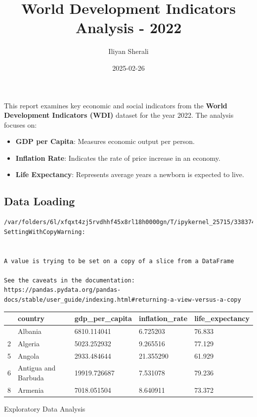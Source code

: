 \documentclass[
  letterpaper,
  DIV=11,
  numbers=noendperiod]{scrartcl}
\title{World Development Indicators Analysis - 2022}
\author{Iliyan Sherali}
\date{2025-02-26}
\providecommand{\tightlist}{%
  \setlength{\itemsep}{0pt}\setlength{\parskip}{0pt}}\usepackage{longtable,booktabs,array}
\begin{document}
\maketitle


This report examines key economic and social indicators from the
\textbf{World Development Indicators (WDI)} dataset for the year 2022.
The analysis focuses on:

\begin{itemize}
\tightlist
\item
  \textbf{GDP per Capita}: Measures economic output per person.
\item
  \textbf{Inflation Rate}: Indicates the rate of price increase in an
  economy.
\item
  \textbf{Life Expectancy}: Represents average years a newborn is
  expected to live.
\end{itemize}

\subsection{Data Loading}\label{data-loading}

\begin{verbatim}
/var/folders/6l/xfqxt4zj5rvdhhf45x8rl18h0000gn/T/ipykernel_25715/3383743568.py:10: SettingWithCopyWarning:


A value is trying to be set on a copy of a slice from a DataFrame

See the caveats in the documentation: https://pandas.pydata.org/pandas-docs/stable/user_guide/indexing.html#returning-a-view-versus-a-copy
\end{verbatim}

\begin{longtable}[]{@{}lllll@{}}
\toprule\noalign{}
& country & gdp\_per\_capita & inflation\_rate & life\_expectancy \\
\midrule\noalign{}
\endhead
\bottomrule\noalign{}
\endlastfoot
1 & Albania & 6810.114041 & 6.725203 & 76.833 \\
2 & Algeria & 5023.252932 & 9.265516 & 77.129 \\
5 & Angola & 2933.484644 & 21.355290 & 61.929 \\
6 & Antigua and Barbuda & 19919.726687 & 7.531078 & 79.236 \\
8 & Armenia & 7018.051504 & 8.640911 & 73.372 \\
\end{longtable}

Exploratory Data Analysis
\end{document}
